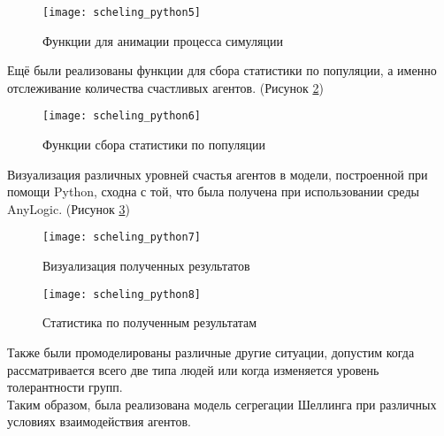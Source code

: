 \newpage

\begin{figure}[h]
	\centering \texttt{[image: scheling\_python5]}
	\caption{Функции для анимации процесса симуляции}
	\label{fig:scheling_python5}
\end{figure}

Ещё были реализованы функции для сбора статистики по популяции, а именно отслеживание количества счастливых агентов. (Рисунок \ref{fig:scheling_python6})

\begin{figure}[h]
	\centering \texttt{[image: scheling\_python6]}
	\caption{Функции сбора статистики по популяции}
	\label{fig:scheling_python6}
\end{figure}

\newpage

Визуализация различных уровней счастья агентов в модели, построенной при помощи Python, сходна с той, что была получена при использовании среды AnyLogic. (Рисунок \ref{fig:scheling_python7})

\begin{figure}[h]
	\centering \texttt{[image: scheling\_python7]}
	\caption{Визуализация полученных результатов}
	\label{fig:scheling_python7}
\end{figure}

\begin{figure}[h]
	\centering \texttt{[image: scheling\_python8]}
	\caption{Статистика по полученным результатам}
	\label{fig:scheling_python8}
\end{figure}

Также были промоделированы различные другие ситуации, допустим когда рассматривается всего две типа людей или когда изменяется уровень толерантности групп.\\

Таким образом, была реализована модель сегрегации Шеллинга при различных условиях взаимодействия агентов.